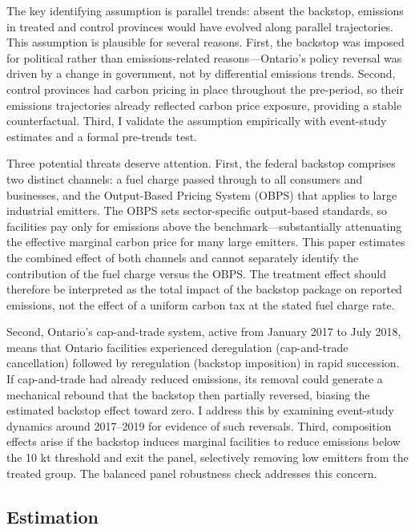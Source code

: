 \documentclass[12pt]{article}
\begin{document}
The key identifying assumption is parallel trends: absent the backstop, emissions in treated and control provinces would have evolved along parallel trajectories. This assumption is plausible for several reasons. First, the backstop was imposed for political rather than emissions-related reasons---Ontario's policy reversal was driven by a change in government, not by differential emissions trends. Second, control provinces had carbon pricing in place throughout the pre-period, so their emissions trajectories already reflected carbon price exposure, providing a stable counterfactual. Third, I validate the assumption empirically with event-study estimates and a formal pre-trends test.

Three potential threats deserve attention. First, the federal backstop comprises two distinct channels: a fuel charge passed through to all consumers and businesses, and the Output-Based Pricing System (OBPS) that applies to large industrial emitters. The OBPS sets sector-specific output-based standards, so facilities pay only for emissions above the benchmark---substantially attenuating the effective marginal carbon price for many large emitters. This paper estimates the combined effect of both channels and cannot separately identify the contribution of the fuel charge versus the OBPS. The treatment effect should therefore be interpreted as the total impact of the backstop package on reported emissions, not the effect of a uniform carbon tax at the stated fuel charge rate.

Second, Ontario's cap-and-trade system, active from January 2017 to July 2018, means that Ontario facilities experienced deregulation (cap-and-trade cancellation) followed by reregulation (backstop imposition) in rapid succession. If cap-and-trade had already reduced emissions, its removal could generate a mechanical rebound that the backstop then partially reversed, biasing the estimated backstop effect toward zero. I address this by examining event-study dynamics around 2017--2019 for evidence of such reversals. Third, composition effects arise if the backstop induces marginal facilities to reduce emissions below the 10 kt threshold and exit the panel, selectively removing low emitters from the treated group. The balanced panel robustness check addresses this concern.

\subsection{Estimation}
\end{document}
